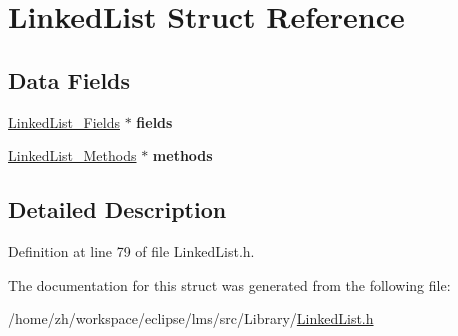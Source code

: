 \hypertarget{structLinkedList}{\section{Linked\-List Struct Reference}
\label{structLinkedList}
}
\subsection*{Data Fields}
\begin{DoxyCompactItemize}
\item 
\hypertarget{structLinkedList_a782be244ed9e9f82bc0925a3a48220f3}{\hyperlink{structLinkedList__Fields}{Linked\-List\-\_\-\-Fields} $\ast$ {\bfseries fields}}\label{structLinkedList_a782be244ed9e9f82bc0925a3a48220f3}

\item 
\hypertarget{structLinkedList_a6d977f15ed59b7984af0c9e418f116dc}{\hyperlink{structLinkedList__Methods}{Linked\-List\-\_\-\-Methods} $\ast$ {\bfseries methods}}\label{structLinkedList_a6d977f15ed59b7984af0c9e418f116dc}

\end{DoxyCompactItemize}


\subsection{Detailed Description}


Definition at line 79 of file Linked\-List.\-h.



The documentation for this struct was generated from the following file\-:\begin{DoxyCompactItemize}
\item 
/home/zh/workspace/eclipse/lms/src/\-Library/\hyperlink{LinkedList_8h}{Linked\-List.\-h}\end{DoxyCompactItemize}

